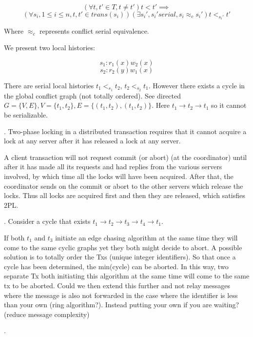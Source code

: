\documentclass[12pt]{article}
\newcounter{question}
\newcommand{\question}[1]{
    \stepcounter{question}
    \thequestion. #1 \hfill
}
\begin{document}
\[(\forall t, t' \in T, t \not = t') t < t' \implies \]
\[(\forall s_i, 1 \leq i \leq n, t, t' \in trans(s_i))(\exists s_i', s_i' serial, s_i \approx_c s_i') t <_{s_i'} t'\]

Where $\approx_c$ represents conflict serial equivalence.

We present two local histories:

\[s_1: r_1(x) w_2(x)\]
\[s_2: r_2(y) w_1(x)\]


There are serial local histories $t_1 <_{s_1} t_2$, $t_2 <_{s_2} t_1$. However there exists a cycle in the global conflict graph (not totally ordered). See directed $G = \{V,E\}, V = \{t_1,t_2\}, E = \{(t_1,t_2), (t_1,t_2)\}$. Here $t_1 \rightarrow t_2 \rightarrow t_1$ so it cannot be serializable.

\pagebreak
\question{Two-phase locking in a distributed transaction requires that it cannot acquire a lock at any server after it has released a lock at any server.

A client transaction will not request commit (or abort) (at the coordinator) until after it has made all its requests and had replies from the various servers involved, by which time all the locks will have been acquired. After that, the coordinator sends on the commit or abort to the other servers which release the locks. Thus all locks are acquired first and then they are released, which satisfies 2PL.}


\question{Consider a cycle that exists $t_1 \rightarrow t_2 \rightarrow t_3 \rightarrow t_4 \rightarrow t_1$.}

If both $t_1$ and $t_3$ initiate an edge chasing algorithm at the same time they will come to the same cyclic graphs yet they both might decide to abort.  A possible solution is to totally order the Txs (unique integer identifiers). So that once a cycle has been determined, the min(cycle) can be aborted. In this way, two separate Tx both initiating this algorithm at the same time will come to the same tx to be aborted.  Could we then extend this further and not relay messages where the message is also not forwarded in the case where the identifier is less than your own (ring algorithm?). Instead putting your own if you are waiting? (reduce message complexity)

\question{}
\end{document}

